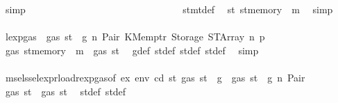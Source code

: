 \begin{isabellebody}
\ simp\isanewline
\ \ \ \ \ \ \ \ \ \ \ \ \ \ \ \ \ \ \ \ \ \ \ \ \ \ \ \ \ \ \isamarkupfalse%
\ stmt{\isacharunderscore}{\kern0pt}def\ \isamarkupfalse%
\ {\isachardoublequoteopen}st{}{\isacharprime}{\kern0pt}{\isacharequal}{\kern0pt}\ st{\isacharprime}{\kern0pt}{\isacharprime}{\kern0pt}{\isacharprime}{\kern0pt}{\isasymlparr}memory\ {\isacharcolon}{\kern0pt}{\isacharequal}{\kern0pt}\ m{\isasymrparr}{\isachardoublequoteclose}\ \isamarkupfalse%
\ simp\isanewline
\ \ \ \ \ \ \ \ \ \ \ \ \ \ \ \ \ \ \ \ \ \ \ \ \ \ \ \ \ \ \isamarkupfalse%
\ \isamarkupfalse%
\ lexp{\isacharunderscore}{\kern0pt}gas\ {\isacharbackquoteopen}{\isasymnot}\ gas\ st\ {\isasymle}\ g{\isacharbackquoteclose}\ n\ Pair\ KMemptr\ Storage\ STArray\ n{}\ p{}\ \isamarkupfalse%
\ {\isachardoublequoteopen}gas\ {\isacharparenleft}{\kern0pt}st{\isacharprime}{\kern0pt}{\isacharprime}{\kern0pt}{\isacharprime}{\kern0pt}{\isasymlparr}memory\ {\isacharcolon}{\kern0pt}{\isacharequal}{\kern0pt}\ m{\isasymrparr}{\isacharparenright}{\kern0pt}\ {\isasymle}\ gas\ st{\isacharprime}{\kern0pt}{\isacharprime}{\kern0pt}{\isachardoublequoteclose}\ \isamarkupfalse%
\ g{\isacharunderscore}{\kern0pt}def\ st{\isacharprime}{\kern0pt}{\isacharunderscore}{\kern0pt}def\ st{\isacharprime}{\kern0pt}{\isacharprime}{\kern0pt}{\isacharunderscore}{\kern0pt}def\ st{\isacharprime}{\kern0pt}{\isacharprime}{\kern0pt}{\isacharprime}{\kern0pt}{\isacharunderscore}{\kern0pt}def\ \isamarkupfalse%
\ simp\isanewline
\ \ \ \ \ \ \ \ \ \ \ \ \ \ \ \ \ \ \ \ \ \ \ \ \ \ \ \ \ \ \isamarkupfalse%
\ \isamarkupfalse%
\ msel{\isacharunderscore}{\kern0pt}ssel{\isacharunderscore}{\kern0pt}expr{\isacharunderscore}{\kern0pt}load{\isacharunderscore}{\kern0pt}rexp{\isacharunderscore}{\kern0pt}gas{\isacharparenleft}{\kern0pt}{}{\isacharparenright}{\kern0pt}{\isacharbrackleft}{\kern0pt}of\ ex\ env\ cd\ st{\isacharprime}{\kern0pt}\ {\isachardoublequoteopen}gas\ st\ {\isacharminus}{\kern0pt}\ g{\isachardoublequoteclose}{\isacharbrackright}{\kern0pt}\ {\isacharbackquoteopen}{\isasymnot}\ gas\ st\ {\isasymle}\ g{\isacharbackquoteclose}\ n\ Pair\ \isamarkupfalse%
\ {\isachardoublequoteopen}gas\ st{\isacharprime}{\kern0pt}{\isacharprime}{\kern0pt}\ {\isasymle}\ gas\ st{\isacharprime}{\kern0pt}{\isachardoublequoteclose}\ \isamarkupfalse%
\ st{\isacharprime}{\kern0pt}{\isacharunderscore}{\kern0pt}def\ st{\isacharprime}{\kern0pt}{\isacharprime}{\kern0pt}{\isacharunderscore}{\kern0pt}def\ \isamarkupfalse%

\end{isabellebody}
